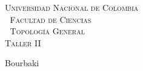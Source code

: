 \documentclass[11pt]{article}
\begin{document}
\setlength{\parindent}{0cm}
\hoffset-0.46cm
\voffset-1.46cm
\begin{window}
\large\scshape \hspace{1.4cm}\textsf{Universidad Nacional de Colombia} \\
\textcolor{white}{\tiny.}  \large \hspace{2.4cm} \textsf{Facultad de Ciencias} \\
\textcolor{white}{\tiny.}   \normalsize\hspace{2.8cm}\textsf{Topología General}\\
\hspace*{3.9cm}\textsf{Taller II}\\
\end{window}
\vspace{0.8cm}
\textsf{Bourbaki} 
\normalsize
\dotfill
\vspace{0.7cm}
\end{document}
